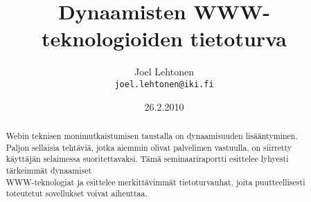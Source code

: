 \documentclass[a4paper,12pt]{article}
\title{Dynaamisten WWW-teknologioiden tietoturva}
\author{Joel Lehtonen\\ \texttt{joel.lehtonen@iki.fi}}
\date{26.2.2010}
\begin{document}
\maketitle

\begin{abstract}
Webin teknisen monimutkaistumisen taustalla on dynaamisuuden
lisääntyminen. Paljon sellaisia tehtäviä, jotka aiemmin olivat
palvelimen vastuulla, on siirretty käyttäjän selaimessa
suoritettavaksi.  Tämä seminaariraportti esittelee lyhyesti tärkeimmät
dynaamiset\\ WWW-teknologiat ja esittelee merkittävimmät
tietoturvauhat, joita puutteellisesti toteutetut sovellukset voivat
aiheuttaa.
\end{abstract}





\end{document}
